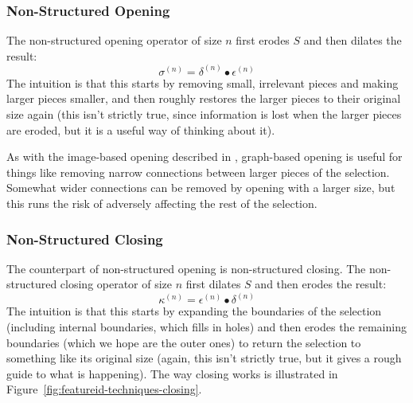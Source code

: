 \subsubsection{Non-Structured Opening}

The non-structured opening operator of size $n$ first erodes $S$ and then dilates the result:
%
\[
\sigma^{(n)} = \delta^{(n)} \bullet \epsilon^{(n)}
\]
%
The intuition is that this starts by removing small, irrelevant pieces and making larger pieces smaller, and then roughly restores the larger pieces to their original size again (this isn't strictly true, since information is lost when the larger pieces are eroded, but it is a useful way of thinking about it).

As with the image-based opening described in \cite{gonzalez02}, graph-based opening is useful for things like removing narrow connections between larger pieces of the selection. Somewhat wider connections can be removed by opening with a larger size, but this runs the risk of adversely affecting the rest of the selection.

\subsubsection{Non-Structured Closing}

The counterpart of non-structured opening is non-structured closing. The non-structured closing operator of size $n$ first dilates $S$ and then erodes the result:
%
\[
\kappa^{(n)} = \epsilon^{(n)} \bullet \delta^{(n)}
\]
%
The intuition is that this starts by expanding the boundaries of the selection (including internal boundaries, which fills in holes) and then erodes the remaining boundaries (which we hope are the outer ones) to return the selection to something like its original size (again, this isn't strictly true, but it gives a rough guide to what is happening). The way closing works is illustrated in Figure~\ref{fig:featureid-techniques-closing}.

